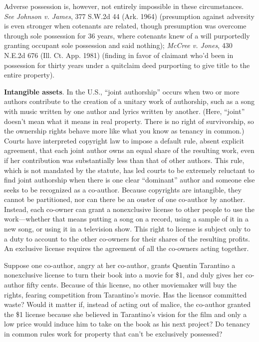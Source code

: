 Adverse possession is, however, not entirely impossible in these circumstances.
\textit{See} \emph{Johnson v. James}, 377 S.W.2d 44 (Ark. 1964) (presumption
against adversity is even stronger when cotenants are related, though
presumption was overcome through sole possession for 36 years, where cotenants
knew of a will purportedly granting occupant sole possession and said nothing);
\emph{McCree v. Jones}, 430 N.E.2d 676 (Ill. Ct. App. 1981) (finding in favor of
claimant who'd been in possession for thirty years under a quitclaim deed
purporting to give title to the entire property).


\item \textbf{Intangible assets}. In the U.S., ``joint authorship'' occurs when
two or more authors contribute to the creation of a unitary work of authorship,
such as a song with music written by one author and lyrics written by another.
(Here, ``joint'' doesn't mean what it means in real property. There is no
right of survivorship, so the ownership rights behave more like what you know
as tenancy in common.) Courts have interpreted copyright law to impose a
default rule, absent explicit agreement, that each joint author owns an equal
share of the resulting work, even if her contribution was substantially less
than that of other authors. This rule, which is not mandated by the statute,
has led courts to be extremely reluctant to find joint authorship when there is
one clear ``dominant'' author and someone else seeks to be recognized as a
co-author. Because copyrights are intangible, they cannot be partitioned, nor
can there be an ouster of one co-author by another. Instead, each co-owner can
grant a nonexclusive license to other people to use the work---whether that
means putting a song on a record, using a sample of it in a new song, or using
it in a television show. This right to license is subject only to a duty to
account to the other co-owners for their shares of the resulting profits. An
exclusive license requires the agreement of all the co-owners acting together.



Suppose one co-author, angry at her co-author, grants Quentin Tarantino a
nonexclusive license to turn their book into a movie for \$1, and duly gives
her co-author fifty cents. Because of this license, no other moviemaker will
buy the rights, fearing competition from Tarantino's movie. Has the licensor
committed waste? Would it matter if, instead of acting out of malice, the
co-author granted the \$1 license because she believed in Tarantino's vision
for the film and only a low price would induce him to take on the book as his
next project? Do tenancy in common rules work for property that can't be
exclusively possessed?



